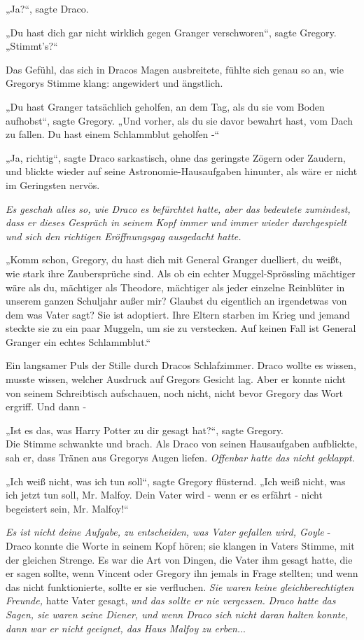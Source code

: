 {„Ja?“, sagte Draco.

„Du hast dich gar nicht wirklich gegen Granger verschworen“, sagte Gregory. „Stimmt's?“

Das Gefühl, das sich in Dracos Magen ausbreitete, fühlte sich genau so an, wie Gregorys Stimme klang: angewidert und ängstlich.

„Du hast Granger tatsächlich geholfen, an dem Tag, als du sie vom Boden aufhobst“, sagte Gregory. „Und vorher, als du sie davor bewahrt hast, vom Dach zu fallen. Du hast einem Schlammblut geholfen -“

„Ja, richtig“, sagte Draco sarkastisch, ohne das geringste Zögern oder Zaudern, und blickte wieder auf seine Astronomie-Hausaufgaben hinunter, als wäre er nicht im Geringsten nervös.

\emph{Es geschah alles so, wie Draco es befürchtet hatte, aber das bedeutete zumindest, dass er dieses Gespräch in seinem Kopf immer und immer wieder durchgespielt und sich den richtigen Eröffnungsgag ausgedacht hatte.}

„Komm schon, Gregory, du hast dich mit General Granger duelliert, du weißt, wie stark ihre Zaubersprüche sind. Als ob ein echter Muggel-Sprössling mächtiger wäre als du, mächtiger als Theodore, mächtiger als jeder einzelne Reinblüter in unserem ganzen Schuljahr außer mir? Glaubst du eigentlich an irgendetwas von dem was Vater sagt? Sie ist adoptiert. Ihre Eltern starben im Krieg und jemand steckte sie zu ein paar Muggeln, um sie zu verstecken. Auf keinen Fall ist General Granger ein echtes Schlammblut.“

Ein langsamer Puls der Stille durch Dracos Schlafzimmer. Draco wollte es wissen, musste wissen, welcher Ausdruck auf Gregors Gesicht lag. Aber er konnte nicht von seinem Schreibtisch aufschauen, noch nicht, nicht bevor Gregory das Wort ergriff. Und dann -

„Ist es das, was Harry Potter zu dir gesagt hat?“, sagte Gregory.\\ Die Stimme schwankte und brach. Als Draco von seinen Hausaufgaben aufblickte, sah er, dass Tränen aus Gregorys Augen liefen. \emph{Offenbar hatte das nicht geklappt}.

„Ich weiß nicht, was ich tun soll“, sagte Gregory flüsternd. „Ich weiß nicht, was ich jetzt tun soll, Mr. Malfoy. Dein Vater wird - wenn er es erfährt - nicht begeistert sein, Mr. Malfoy!“

\emph{Es ist nicht deine Aufgabe, zu entscheiden, was Vater gefallen wird, Goyle} - Draco konnte die Worte in seinem Kopf hören; sie klangen in Vaters Stimme, mit der gleichen Strenge. Es war die Art von Dingen, die Vater ihm gesagt hatte, die er sagen sollte, wenn Vincent oder Gregory ihn jemals in Frage stellten; und wenn das nicht funktionierte, sollte er sie verfluchen. \emph{Sie waren keine gleichberechtigten Freunde,} hatte Vater gesagt, \emph{und das sollte er nie vergessen.} \emph{Draco hatte das Sagen, sie waren seine Diener, und wenn Draco sich nicht daran halten konnte, dann war er nicht geeignet, das Haus Malfoy zu erben.}..

}
